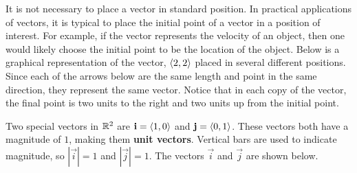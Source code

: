 \documentclass[handout]{ximera}
\begin{document}
It is not necessary to place a vector in standard position.  
In practical applications of vectors, it is typical to place the initial point of a vector in a position of interest.  
For example, if the vector represents the velocity of an object, then one would likely choose the initial point to be the location of the object.
Below is a graphical representation of the vector, $\left\langle 2,2\right\rangle$ placed in several different positions.
Since each of the arrows below are the same length and point in the same direction, they represent the same vector.
Notice that in each copy of the vector, the final point is two units to the right and two units up from the initial point. 
\begin{image}
\end{image}

Two special vectors in $\mathbb R^2$ are $\mathbf{i} = \left\langle 1,0\right\rangle$ and $\mathbf{j} = \left\langle 0,1\right\rangle$.
These vectors both have a magnitude of $1$, making them {\bf unit vectors}. 
Vertical bars are used to indicate magnitude, so $|\vec{i}| = 1$ and $|\vec{j}| = 1$.
The vectors $\vec{i}$ and $\vec{j}$ are shown below.

\begin{image}
\end{image}
\end{document}
